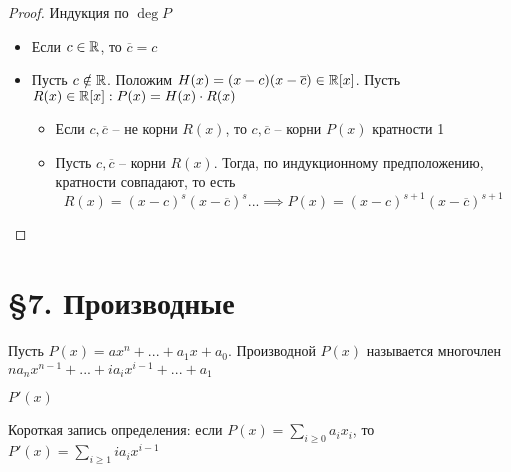 \begin{proof}
	Индукция по $\deg P$
    \begin{itemize}
        \item Если $c \in \mathbb{R}$, то $ \overline{c} = c $
        \item Пусть $c \notin \mathbb{R} $. Положим $H(x) = (x - c)(x - \overline{c}) \in \mathbb{R}[x] $.   Пусть $ R(x) \in \mathbb{R}[x] : P(x) = H(x) \cdot R(x) $
        \begin{itemize}
            \item Если $c, \overline{c} $ -- не корни $R(x)$, то $c, \overline{c} $ -- корни $P(x)$ кратности 1
            \item Пусть $c, \overline{c}$ -- корни $R(x)$. Тогда, по индукционному предположению, кратности совпадают, то есть
            $$ R(x) = (x - c)^s (x - \overline{c})^s ... \implies P(x) = (x - c)^{s + 1} (x - \overline{c})^{s + 1} $$
        \end{itemize}
    \end{itemize}
\end{proof}

\section{\S7. Производные}

\begin{definition}
    Пусть $P(x) = ax^n + ... + a_1x + a_0 $. Производной $P(x)$ называется многочлен $na_nx^{n-1} + ... + ia_ix^{i-1} + ... + a_1 $
\end{definition}

\begin{notation}
	$ P'(x) $
\end{notation}

Короткая запись определения: если $P(x) = \sum_{i \ge 0} a_ix_i$, то $P'(x) = \sum_{i \ge 1}ia_ix^{i-1} $

